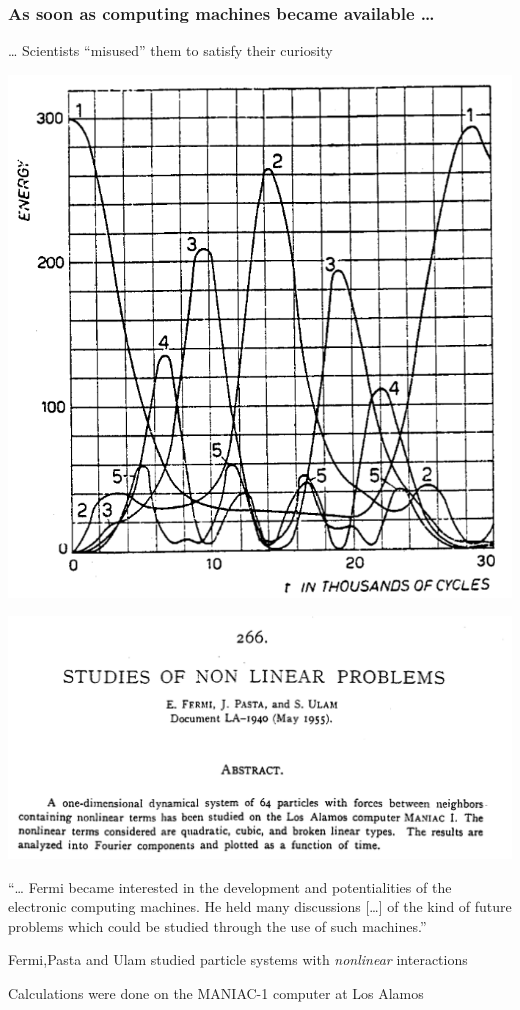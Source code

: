 \begin{frame}\frametitle{As soon as computing machines became available \ldots{}}

  \ldots{} Scientists ``misused'' them to satisfy their curiosity

  \begin{minipage}{0.35\textwidth}
    \includegraphics[width=\textwidth]{pic/fpupic}
  \end{minipage}\hfill
  \begin{minipage}{0.6\textwidth}
    \includegraphics[width=\textwidth]{pic/fputitle}
  \end{minipage}


  ``\ldots{} Fermi became interested in the development and potentialities
  of the electronic computing machines. He held many discussions
  {[}\ldots{}{]} of the kind of future problems which could be studied
  through the use of such machines.''

  Fermi,Pasta and Ulam studied particle systems with \emph{nonlinear}
  interactions

  Calculations were done on the MANIAC-1 computer at Los Alamos

\end{frame}

